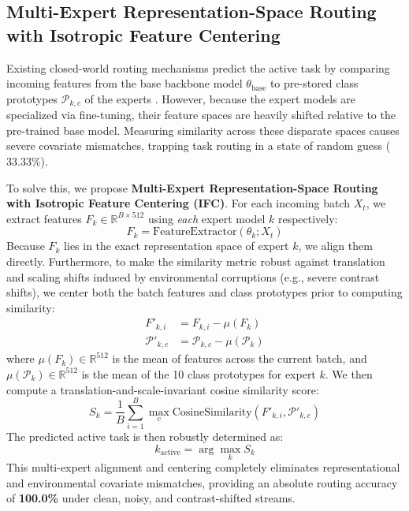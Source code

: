 \documentclass{article}
\theoremstyle{plain}
\theoremstyle{definition}
\theoremstyle{remark}
\begin{document}
\subsection{Multi-Expert Representation-Space Routing with Isotropic Feature Centering}
Existing closed-world routing mechanisms predict the active task by comparing incoming features from the base backbone model $\theta_{\text{base}}$ to pre-stored class prototypes $\mathcal{P}_{k, c}$ of the experts \cite{Submission2Paper}. However, because the expert models are specialized via fine-tuning, their feature spaces are heavily shifted relative to the pre-trained base model. Measuring similarity across these disparate spaces causes severe covariate mismatches, trapping task routing in a state of random guess ($33.33\%$).

To solve this, we propose \textbf{Multi-Expert Representation-Space Routing with Isotropic Feature Centering (IFC)}. For each incoming batch $X_t$, we extract features $F_{k} \in \mathbb{R}^{B \times 512}$ using \emph{each} expert model $k$ respectively:
\begin{equation}
    F_{k} = \text{FeatureExtractor}(\theta_k; X_t)
\end{equation}
Because $F_{k}$ lies in the exact representation space of expert $k$, we align them directly. Furthermore, to make the similarity metric robust against translation and scaling shifts induced by environmental corruptions (e.g., severe contrast shifts), we center both the batch features and class prototypes prior to computing similarity:
\begin{align}
    F'_{k, i} &= F_{k, i} - \mu(F_k) \\
    \mathcal{P}'_{k, c} &= \mathcal{P}_{k, c} - \mu(\mathcal{P}_k)
\end{align}
where $\mu(F_k) \in \mathbb{R}^{512}$ is the mean of features across the current batch, and $\mu(\mathcal{P}_k) \in \mathbb{R}^{512}$ is the mean of the 10 class prototypes for expert $k$. We then compute a translation-and-scale-invariant cosine similarity score:
\begin{equation}
    S_k = \frac{1}{B} \sum_{i=1}^B \max_{c} \text{CosineSimilarity}(F'_{k, i}, \mathcal{P}'_{k, c})
\end{equation}
The predicted active task is then robustly determined as:
\begin{equation}
    k_{\text{active}} = \arg\max_k S_k
\end{equation}
This multi-expert alignment and centering completely eliminates representational and environmental covariate mismatches, providing an absolute routing accuracy of \textbf{100.0\%} under clean, noisy, and contrast-shifted streams.
\end{document}
